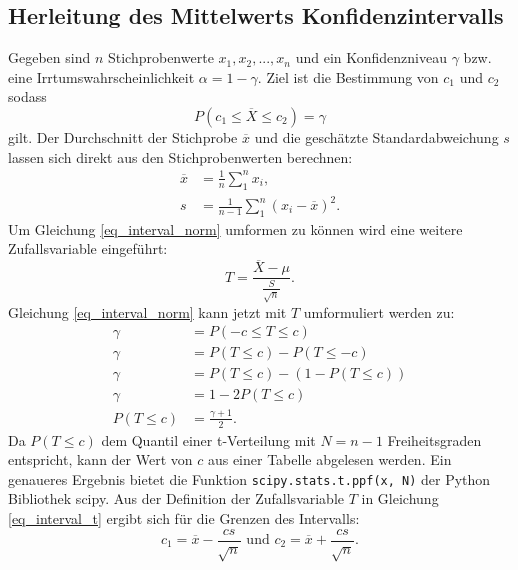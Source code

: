 \documentclass[10pt,twocolumn]{scrartcl}
\begin{document}
	\subsection{Herleitung des Mittelwerts Konfidenzintervalls}
		\label{chap_interval_mean_math}
		Gegeben sind $n$ Stichprobenwerte $x_1, x_2, ..., x_n$ und ein Konfidenzniveau $\gamma$ bzw. eine Irrtumswahrscheinlichkeit $\alpha = 1 - \gamma$.
		Ziel ist die Bestimmung von $c_1$ und $c_2$ sodass
		\begin{equation} \label{eq_interval_norm}
		P(c_1 \le \overline{X} \le c_2) = \gamma
		\end{equation}
		gilt.
		Der Durchschnitt der Stichprobe $\overline{x}$ und die geschätzte Standardabweichung $s$ lassen sich direkt aus den Stichprobenwerten berechnen:
		\begin{align}
		\overline{x} &=  \frac{1}{n} \sum_1^n{x_i} , \\
		s &= \frac{1}{n-1} \sum_1^n{(x_i - \overline{x})^2} .
		\end{align}
		Um Gleichung \ref{eq_interval_norm} umformen zu können wird eine weitere Zufallsvariable eingeführt:
		\begin{equation} \label{eq_interval_t}
		T = \frac{\overline{X} - \mu}{\frac{S}{\sqrt{n}}} .
		\end{equation}
		Gleichung \ref{eq_interval_norm} kann jetzt mit $T$ umformuliert werden zu:
		\begin{align}
		\gamma &= P(-c \le T \le c) \\ \nonumber
		\gamma &= P(T \le c) - P(T \le -c) \\ \nonumber
		\gamma &= P(T \le c) - (1 - P(T \le c)) \\ \nonumber
		\gamma &= 1 - 2 P(T \le c) \\
		P(T \le c) &= \frac{\gamma + 1}{2} .
		\end{align}
		Da $P(T \le c)$ dem Quantil einer t-Verteilung mit $N = n-1$ Freiheitsgraden entspricht, kann der Wert von $c$ aus einer Tabelle abgelesen werden. Ein genaueres Ergebnis bietet die Funktion \texttt{scipy.stats.t.ppf(x, N)} der Python Bibliothek scipy\cite{scipy}.
		Aus der Definition der Zufallsvariable $T$ in Gleichung \ref{eq_interval_t} ergibt sich für die Grenzen des Intervalls:
		\begin{equation}
		c_1 = \overline{x} - \frac{cs}{\sqrt{n}} \mbox{ und } c_2 = \overline{x} + \frac{cs}{\sqrt{n}}.
		\end{equation}
\end{document}
